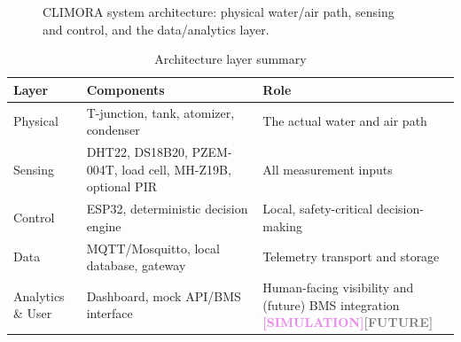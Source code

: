 \documentclass[11pt,a4paper]{article}
\newcommand{\simulation}{\textcolor{violet}{\textbf{[SIMULATION]}}}
\newcommand{\future}{\textcolor{gray}{\textbf{[FUTURE]}}}
\begin{document}
\begin{figure}[h!]
\caption{CLIMORA system architecture: physical water/air path, sensing and control, and the data/analytics layer.}
\end{figure}

\begin{table}[h!]
\centering
\caption{Architecture layer summary}
\begin{tabular}{p{2.6cm}p{5.5cm}p{5.5cm}}
\toprule
\textbf{Layer} & \textbf{Components} & \textbf{Role} \\
\midrule
Physical & T-junction, tank, atomizer, condenser & The actual water and air path \\
Sensing & DHT22, DS18B20, PZEM-004T, load cell, MH-Z19B, optional PIR & All measurement inputs \\
Control & ESP32, deterministic decision engine & Local, safety-critical decision-making \\
Data & MQTT/Mosquitto, local database, gateway & Telemetry transport and storage \\
Analytics \& User & Dashboard, mock API/BMS interface & Human-facing visibility and (future) BMS integration \simulation\future \\
\bottomrule
\end{tabular}
\end{table}
\end{document}
